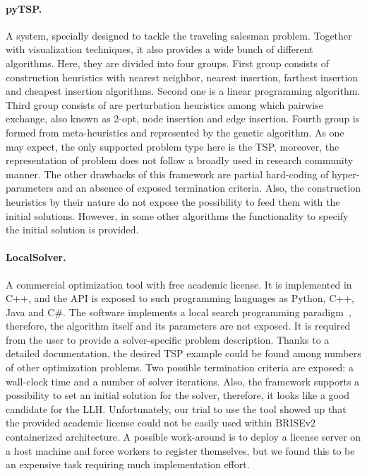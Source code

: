 \paragraph{pyTSP.} A system, specially designed to tackle the traveling salesman problem. Together with visualization techniques, it also provides a wide bunch of different algorithms. Here, they are divided into four groups. First group consists of construction heuristics with nearest neighbor, nearest insertion, farthest insertion and cheapest insertion algorithms. Second one is a linear programming algorithm. Third group consists of are perturbation heuristics among which pairwise exchange, also known as 2-opt, node insertion and edge insertion. Fourth group is formed from meta-heuristics and represented by the genetic algorithm. As one may expect, the only supported problem type here is the TSP, moreover, the representation of problem does not follow a broadly used in research community manner. The other drawbacks of this framework are partial hard-coding of hyper-parameters and an absence of exposed termination criteria. Also, the construction heuristics by their nature do not expose the possibility to feed them with the initial solutions. However, in some other algorithms the functionality to specify the initial solution is provided.

\paragraph{LocalSolver.} A commercial optimization tool with free academic license. It is implemented in C++, and the API is exposed to such programming languages as Python, C++, Java and C\#. The software implements a local search programming paradigm~\cite{benoist2010toward,benoist2011localsolver}, therefore, the algorithm itself and its parameters are not exposed. It is required from the user to provide a solver-specific problem description. Thanks to a detailed documentation, the desired TSP example could be found among numbers of other optimization problems. Two possible termination criteria are exposed: a wall-clock time and a number of solver iterations. Also, the framework supports a possibility to set an initial solution for the solver, therefore, it looks like a good candidate for the LLH. Unfortunately, our trial to use the tool showed up that the provided academic license could not be easily used within BRISEv2 containerized architecture. A possible work-around is to deploy a license server on a host machine and force workers to register themselves, but we found this to be an expensive task requiring much implementation effort.

